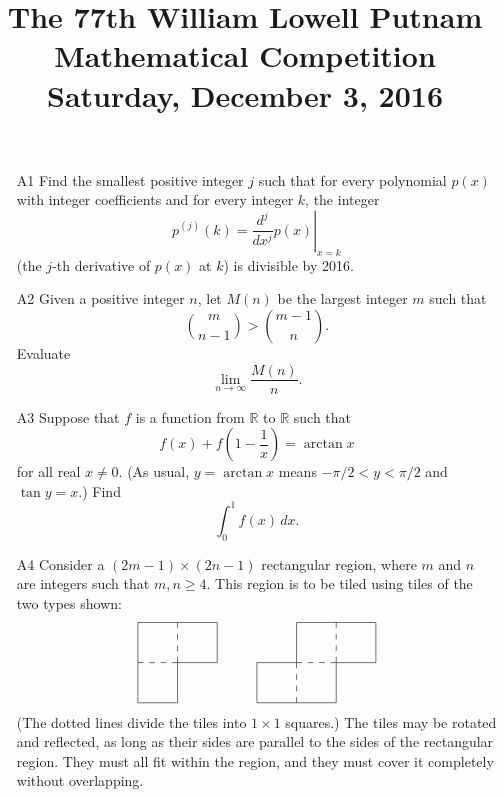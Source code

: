 \documentclass[amssymb,twocolumn,pra,10pt,aps]{revtex4-1}
\begin{document}
\title{The 77th William Lowell Putnam Mathematical Competition \\
    Saturday, December 3, 2016}
\maketitle

\begin{itemize}

\item[A1] 
Find the smallest positive integer $j$ such that for every polynomial $p(x)$ with integer coefficients and for every integer $k$, the integer
\[
p^{(j)}(k) = \left. \frac{d^j}{dx^j} p(x) \right|_{x=k} 
\] 
(the $j$-th derivative of $p(x)$ at $k$) is divisible by 2016.

\item[A2]
Given a positive integer $n$, let $M(n)$ be the largest integer $m$ such that 
\[
\binom{m}{n-1} > \binom{m-1}{n}.
\]
Evaluate 
\[
\lim_{n \to \infty} \frac{M(n)}{n}.
\]

\item[A3]
Suppose that $f$ is a function from $\mathbb{R}$ to $\mathbb{R}$ such that
\[
f(x) + f\left( 1 - \frac{1}{x} \right) = \arctan x
\]
for all real $x \neq 0$. (As usual, $y = \arctan x$ means $-\pi/2 < y < \pi/2$ and $\tan y = x$.) Find 
\[
\int_0^1 f(x)\,dx.
\]

\item[A4]
Consider a $(2m-1) \times (2n-1)$ rectangular region, where $m$ and $n$ are integers such that $m, n \geq 4$. This region is to be tiled using tiles of the two types shown:
\[
\setlength{\unitlength}{4144sp}%
%
\begingroup\makeatletter\ifx\SetFigFont\undefined%
\gdef\SetFigFont#1#2#3#4#5{%
  \reset@font\fontsize{#1}{#2pt}%
  \fontfamily{#3}\fontseries{#4}\fontshape{#5}%
  \selectfont}%
\fi\endgroup%
\begin{picture}(2724,924)(1339,-1423)
\thinlines
{\put(1351,-511){\line( 0,-1){900}}
\put(1351,-1411){\line( 1, 0){450}}
\put(1801,-1411){\line( 0, 1){450}}
\put(1801,-961){\line( 1, 0){450}}
\put(2251,-961){\line( 0, 1){450}}
\put(2251,-511){\line(-1, 0){900}}
}%
{\multiput(1351,-961)(128.57143,0.00000){4}{\line( 1, 0){ 64.286}}
\multiput(1801,-961)(0.00000,128.57143){4}{\line( 0, 1){ 64.286}}
}%
{\put(2701,-961){\line( 0,-1){450}}
\put(2701,-1411){\line( 1, 0){900}}
\put(3601,-1411){\line( 0, 1){450}}
\put(3601,-961){\line( 1, 0){450}}
\put(4051,-961){\line( 0, 1){450}}
\put(4051,-511){\line(-1, 0){900}}
\put(3151,-511){\line( 0,-1){450}}
\put(3151,-961){\line(-1, 0){450}}
}%
{\multiput(3151,-1411)(0.00000,128.57143){4}{\line( 0, 1){ 64.286}}
\multiput(3151,-961)(128.57143,0.00000){4}{\line( 1, 0){ 64.286}}
\multiput(3601,-961)(0.00000,128.57143){4}{\line( 0, 1){ 64.286}}
}%
\end{picture}%
\]
(The dotted lines divide the tiles into $1 \times 1$ squares.)
The tiles may be rotated and reflected, as long as their sides are parallel to the sides
of the rectangular region. They must all fit within the region, and they must cover it completely without overlapping.


\end{itemize}
\end{document}
